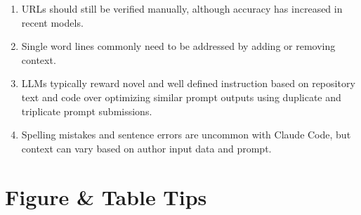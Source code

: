 \documentclass{article}
\begin{document}
\begin{enumerate}
\begin{enumerate}
    \item URLs should still be verified manually, although accuracy has increased in recent models.
    \item Single word lines commonly need to be addressed by adding or removing context.
    \item LLMs typically reward novel and well defined instruction based on repository text and code over optimizing similar prompt outputs using duplicate and triplicate prompt submissions.
    \item Spelling mistakes and sentence errors are uncommon with Claude Code, but context can vary based on author input data and prompt. \cite{kawchak20}
\end{enumerate}
\end{enumerate}

 

 
\section{Figure \& Table Tips}
\end{document}
